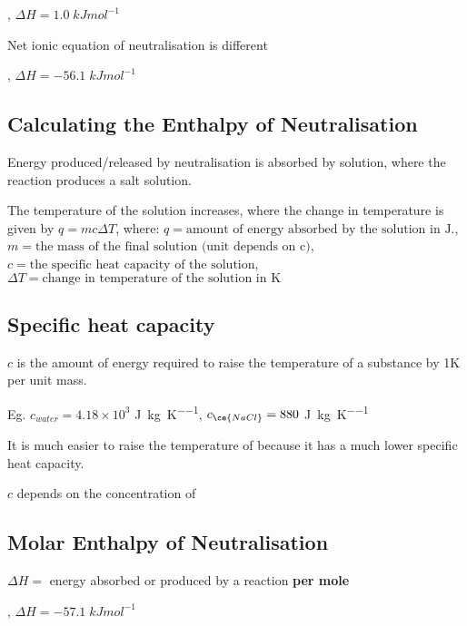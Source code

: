 		\begin{center}
			, $\Delta H = 1.0 \; kJmol^{-1}$
		\end{center}

		Net ionic equation of neutralisation is different

		\begin{center}
			, $\Delta H = -56.1 \; kJmol^{-1}$
		\end{center}

	\subsection{Calculating the Enthalpy of Neutralisation}
		Energy produced/released by neutralisation is absorbed by solution, where the reaction produces a salt solution.

		The temperature of the solution increases, where the change in temperature is given by $q = mc \Delta T$, where: $q = \text{amount of energy absorbed by the solution in J}$., $m = \text{the mass of the final solution (unit depends on c)}$, $c = \text{the specific heat capacity of the solution}$, $\Delta T = \text{change in temperature of the solution in K}$

	\subsection{Specific heat capacity}
		$c$ is the amount of energy required to raise the temperature of a substance by 1K per unit mass.

		Eg. $c_{water} = 4.18 \times 10^3$ \si{\joule\per\kilogram\per\kelvin}, $c_{\ce{NaCl}} = 880$ \si{\joule\per\kilogram\per\kelvin}

		It is much easier to raise the temperature of  because it has a much lower specific heat capacity.

		$c$ depends on the concentration of 

	\subsection{Molar Enthalpy of Neutralisation}
		$\Delta H =$ energy absorbed or produced by a reaction \textbf{per mole}

		\begin{center}
			, $\Delta H = -57.1 \; kJmol^{-1}$
		\end{center}
	
